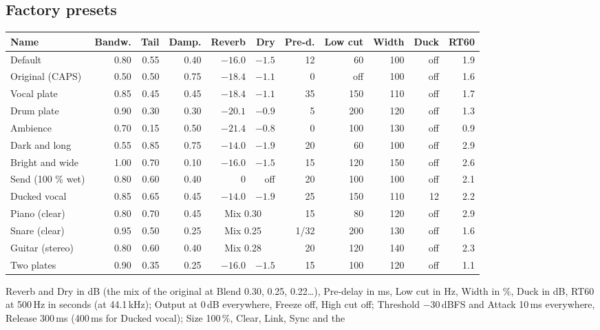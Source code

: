 \documentclass[a4paper,11pt]{article}
\newcommand{\dB}{\,dB}
\newcommand{\dBFS}{\,dBFS}
\begin{document}
\subsection{Factory presets}
\begin{center}
\small
\begin{tabular}{@{}l r r r r r r r r r r@{}}
\toprule
Name & Bandw. & Tail & Damp. & Reverb & Dry & Pre-d. & Low cut & Width & Duck & RT60 \\
\midrule
Default           & 0.80 & 0.55 & 0.40 & $-16.0$ & $-1.5$ & 12 & 60  & 100 & off & 1.9 \\
Original (CAPS)   & 0.50 & 0.50 & 0.75 & $-18.4$ & $-1.1$ & 0  & off & 100 & off & 1.6 \\
Vocal plate       & 0.85 & 0.45 & 0.45 & $-18.4$ & $-1.1$ & 35 & 150 & 110 & off & 1.7 \\
Drum plate        & 0.90 & 0.30 & 0.30 & $-20.1$ & $-0.9$ & 5  & 200 & 120 & off & 1.3 \\
Ambience          & 0.70 & 0.15 & 0.50 & $-21.4$ & $-0.8$ & 0  & 100 & 130 & off & 0.9 \\
Dark and long     & 0.55 & 0.85 & 0.75 & $-14.0$ & $-1.9$ & 20 & 60  & 100 & off & 2.9 \\
Bright and wide   & 1.00 & 0.70 & 0.10 & $-16.0$ & $-1.5$ & 15 & 120 & 150 & off & 2.6 \\
Send (100 \% wet) & 0.80 & 0.60 & 0.40 & 0 & off & 20 & 100 & 100 & off & 2.1 \\
Ducked vocal      & 0.85 & 0.65 & 0.45 & $-14.0$ & $-1.9$ & 25 & 150 & 110 & 12  & 2.2 \\
Piano (clear)     & 0.80 & 0.70 & 0.45 & \multicolumn{2}{c}{Mix 0.30} & 15 & 80 & 120 & off & 2.9 \\
Snare (clear)     & 0.95 & 0.50 & 0.25 & \multicolumn{2}{c}{Mix 0.25} & 1/32 & 200 & 130 & off & 1.6 \\
Guitar (stereo)   & 0.80 & 0.60 & 0.40 & \multicolumn{2}{c}{Mix 0.28} & 20 & 120 & 140 & off & 2.3 \\
Two plates        & 0.90 & 0.35 & 0.25 & $-16.0$ & $-1.5$ & 15 & 100 & 120 & off & 1.1 \\
\bottomrule
\end{tabular}
\end{center}
Reverb and Dry in dB (the mix of the original at Blend 0.30, 0.25, 0.22\ldots), Pre-delay in
ms, Low cut in Hz, Width in \%, Duck in dB, RT60 at 500\,Hz in seconds (at 44.1\,kHz); Output at
0\dB{} everywhere, Freeze off, High cut off; Threshold $-30$\dBFS{} and Attack 10\,ms
everywhere, Release 300\,ms (400\,ms for Ducked vocal); Size 100\,\%, Clear, Link, Sync and the
\end{document}
